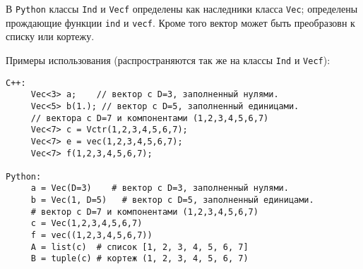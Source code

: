 В  {\tt Python} классы {\tt Ind} и {\tt Vecf} определены как наследники класса {\tt Vec}; определены прождающие функции
{\tt ind} и {\tt vecf}. Кроме того вектор может быть преобразовн к списку или кортежу.

Примеры использования (распространяются так же на классы {\tt Ind} и {\tt Vecf}):
\begin{verbatim}
C++:
     Vec<3> a;    // вектор с D=3, заполненный нулями.
     Vec<5> b(1.); // вектор с D=5, заполненный единицами.
     // вектора с D=7 и компонентами (1,2,3,4,5,6,7)
     Vec<7> c = Vctr(1,2,3,4,5,6,7);  
     Vec<7> e = vec(1,2,3,4,5,6,7); 
     Vec<7> f(1,2,3,4,5,6,7); 

Python:
     a = Vec(D=3)    # вектор с D=3, заполненный нулями.
     b = Vec(1, D=5)   # вектор с D=5, заполненный единицами.
     # вектор с D=7 и компонентами (1,2,3,4,5,6,7)
     c = Vec(1,2,3,4,5,6,7) 
     f = vec((1,2,3,4,5,6,7)) 
     A = list(c)  # список [1, 2, 3, 4, 5, 6, 7]
     B = tuple(c) # кортеж (1, 2, 3, 4, 5, 6, 7)
\end{verbatim}


